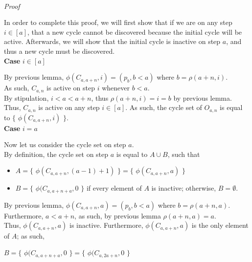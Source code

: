 \documentclass[a4paper,12pt]{article}
\begin{document}
\noindent \\
\textit{Proof}

\noindent In order to complete this proof, we will first show that if we are on any step $i \in [a]$, that a new cycle cannot be discovered because the initial cycle will be active. Afterwards, we will show that the initial cycle is inactive on step $a$, and thus a new cycle must be discovered.\\

\noindent
\textbf{Case} $i \in [a]$

\noindent By previous lemma, $\phi(C_{a, a + n}, i) = (p_b, b < a)$ where $b = \rho(a + n, i)$.\\

\noindent As such, $C_{a, n}$ is active on step $i$ whenever $b < a$.\\

\noindent By stipulation, $i < a < a + n$, thus $\rho(a + n, i) = i = b$ by previous lemma.\\

\noindent Thus, $C_{a, n}$ is active on any step $i \in [a]$. As such, the cycle set of $O_{a, n}$ is equal to $\{$ $\phi(C_{a, a + n}, i)$ $\}$.\\

\noindent
\textbf{Case} $i = a$

\noindent Now let us consider the cycle set on step $a$.\\

\noindent By definition, the cycle set on step $a$ is equal to $A \cup B$, such that
\begin{itemize}
\item $A = \{$ $\phi(C_{a, a + n}, (a - 1) + 1)$ $\} = \{$ $\phi(C_{a, a + n}, a)$ $\}$
\item $B = \{$ $\phi(C_{a, a + n + a}, 0$ $\}$ if every element of $A$ is inactive; otherwise, $B = \emptyset$.
\end{itemize}

\noindent By previous lemma, $\phi(C_{a, a + n}, a) = (p_b, b < a)$ where $b = \rho(a + n, a)$.\\

\noindent Furthermore, $a < a + n$, as such, by previous lemma $\rho(a + n, a) = a$.\\

\noindent Thus, $\phi(C_{a, a + n}, a)$ is inactive. Furthermore, $\phi(C_{a, a + n}, a)$ is the only element of $A$; as such,
\begin{center}
$B = \{$ $\phi(C_{a, a + n + a}, 0$ $\} = \{$ $\phi(C_{a, 2a + n}, 0$ $\}$
\end{center}
\end{document}
